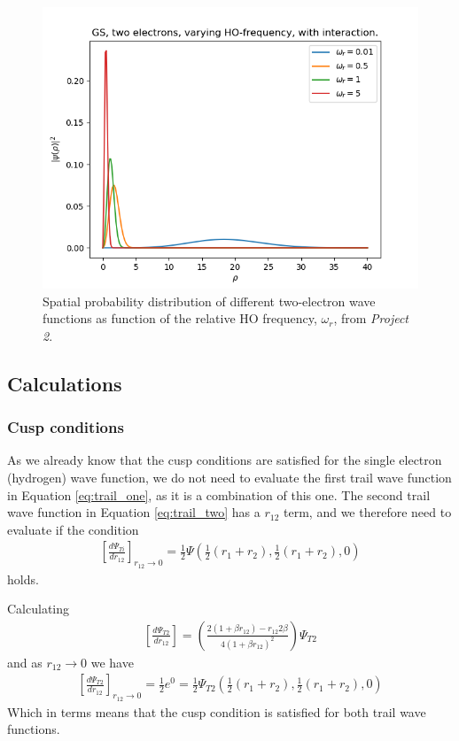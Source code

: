 \documentclass[12pt,english,a4paper]{article}
\begin{document}
\begin{figure}[H]
    \centering
    \includegraphics[scale=0.7]{../figures/project2_E_GS_with_interaction.png}
    \caption{Spatial probability distribution of different two-electron wave functions as function of the relative HO frequency, $\omega_r$, from \textit{Project 2}.}
    \label{fig:proj2_wave_functions}
\end{figure}

\subsection{Calculations} \label{section:appendix:calculations}
\subsubsection{Cusp conditions} \label{section:appendix:calculations:cusp}
As we already know that the cusp conditions are satisfied for the single electron (hydrogen) wave function, we do not need to evaluate the first trail wave function in Equation \eqref{eq:trail_one}, as it is a combination of this one. The second trail wave function in Equation \eqref{eq:trail_two} has a $r_{12}$ term, and we therefore need to evaluate if the condition
\begin{align*}
    \left[\frac{d\Psi_{Ti}}{dr_{12}}\right]_{r_{12}\rightarrow 0}=\frac{1}{2}\Psi(\frac{1}{2}(r_1+r_2),\frac{1}{2}(r_1+r_2),0)
\end{align*}
holds.

Calculating
\begin{align*}
    \left[\frac{d\Psi_{T2}}{dr_{12}}\right]=\left(\frac{2\left(1+\beta r_{12}\right)-r_{12}2\beta}{4\left(1+\beta r_{12}\right)^2}\right)\Psi_{T2}
\end{align*}
and as $r_{12}\rightarrow 0$ we have
\begin{align*}
    \left[\frac{d\Psi_{T2}}{dr_{12}}\right]_{r_{12}\rightarrow 0}=\frac{1}{2}e^0=\frac{1}{2}\Psi_{T2}(\frac{1}{2}(r_1+r_2),\frac{1}{2}(r_1+r_2),0)
\end{align*}
Which in terms means that the cusp condition is satisfied for both trail wave functions.
\end{document}
